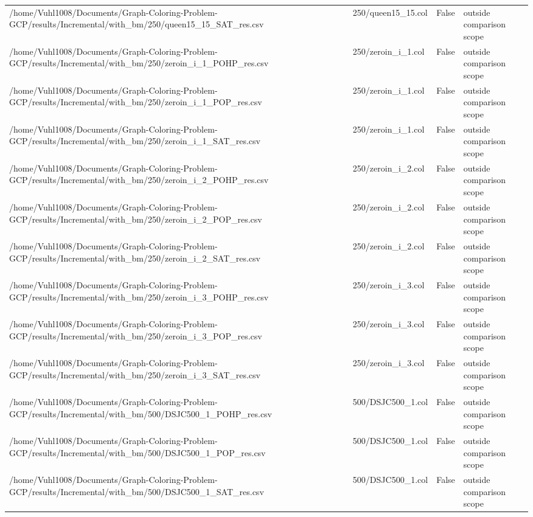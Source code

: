 \begin{table}[htbp]
\begin{tabular}{llll}
/home/Vuhl1008/Documents/Graph-Coloring-Problem-GCP/results/Incremental/with\_bm/250/queen15\_15\_SAT\_res.csv & 250/queen15\_15.col & False & outside comparison scope \\
/home/Vuhl1008/Documents/Graph-Coloring-Problem-GCP/results/Incremental/with\_bm/250/zeroin\_i\_1\_POHP\_res.csv & 250/zeroin\_i\_1.col & False & outside comparison scope \\
/home/Vuhl1008/Documents/Graph-Coloring-Problem-GCP/results/Incremental/with\_bm/250/zeroin\_i\_1\_POP\_res.csv & 250/zeroin\_i\_1.col & False & outside comparison scope \\
/home/Vuhl1008/Documents/Graph-Coloring-Problem-GCP/results/Incremental/with\_bm/250/zeroin\_i\_1\_SAT\_res.csv & 250/zeroin\_i\_1.col & False & outside comparison scope \\
/home/Vuhl1008/Documents/Graph-Coloring-Problem-GCP/results/Incremental/with\_bm/250/zeroin\_i\_2\_POHP\_res.csv & 250/zeroin\_i\_2.col & False & outside comparison scope \\
/home/Vuhl1008/Documents/Graph-Coloring-Problem-GCP/results/Incremental/with\_bm/250/zeroin\_i\_2\_POP\_res.csv & 250/zeroin\_i\_2.col & False & outside comparison scope \\
/home/Vuhl1008/Documents/Graph-Coloring-Problem-GCP/results/Incremental/with\_bm/250/zeroin\_i\_2\_SAT\_res.csv & 250/zeroin\_i\_2.col & False & outside comparison scope \\
/home/Vuhl1008/Documents/Graph-Coloring-Problem-GCP/results/Incremental/with\_bm/250/zeroin\_i\_3\_POHP\_res.csv & 250/zeroin\_i\_3.col & False & outside comparison scope \\
/home/Vuhl1008/Documents/Graph-Coloring-Problem-GCP/results/Incremental/with\_bm/250/zeroin\_i\_3\_POP\_res.csv & 250/zeroin\_i\_3.col & False & outside comparison scope \\
/home/Vuhl1008/Documents/Graph-Coloring-Problem-GCP/results/Incremental/with\_bm/250/zeroin\_i\_3\_SAT\_res.csv & 250/zeroin\_i\_3.col & False & outside comparison scope \\
/home/Vuhl1008/Documents/Graph-Coloring-Problem-GCP/results/Incremental/with\_bm/500/DSJC500\_1\_POHP\_res.csv & 500/DSJC500\_1.col & False & outside comparison scope \\
/home/Vuhl1008/Documents/Graph-Coloring-Problem-GCP/results/Incremental/with\_bm/500/DSJC500\_1\_POP\_res.csv & 500/DSJC500\_1.col & False & outside comparison scope \\
/home/Vuhl1008/Documents/Graph-Coloring-Problem-GCP/results/Incremental/with\_bm/500/DSJC500\_1\_SAT\_res.csv & 500/DSJC500\_1.col & False & outside comparison scope \\

\end{tabular}
\end{table}
